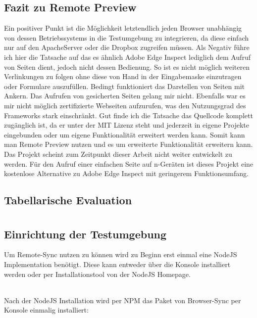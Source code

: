 		\subsection{Fazit zu Remote Preview}
		Ein positiver Punkt ist die Möglichkeit letztendlich jeden Browser unabhängig von dessen Betriebssystems in die 				Testumgebung zu integrieren, da diese einfach nur auf den ApacheServer oder die Dropbox zugreifen müssen. Als Negativ 		führe ich hier die Tatsache auf das es ähnlich Adobe Edge Inspect lediglich dem Aufruf von Seiten dient, jedoch nicht 			dessen Bedienung. So ist es nicht möglich weiteren Verlinkungen zu folgen ohne diese von Hand in der Eingabemaske 			einzutragen oder Formulare auszufüllen. Bedingt funktioniert das Darstellen von Seiten mit Ankern. Das Aufrufen von 			gesicherten Seiten gelang mir nicht. Ebenfalls war es  mir nicht möglich zertifizierte Webseiten aufzurufen, was den 				Nutzungsgrad des Frameworks stark einschränkt. Gut finde ich die Tatsache das Quellcode komplett zugänglich ist, da er 		unter der MIT Lizenz steht und	jederzeit in eigene Projekte eingebunden oder um eigene Funktionalität erweitert werden 			kann. Somit kann man Remote Preview nutzen und es um erweiterte Funktionalität erweitern kann. Das Projekt 				scheint zum Zeitpunkt dieser Arbeit nicht weiter entwickelt zu werden. Für den Aufruf einer einfachen Seite auf n-Geräten 		ist dieses Projekt eine kostenlose Alternative zu Adobe Edge Inspect mit geringerem Funktionsumfang.
		
				
		\subsection{Tabellarische Evaluation}
		
	
\pagebreak
	\section{}	
	\subsection{Einrichtung der Testumgebung}
	Um Remote-Sync nutzen zu können wird zu Beginn erst einmal eine NodeJS Implementation benötigt. Diese kann entweder über die Konsole installiert werden oder per Installationstool von der NodeJS Homepage.
	
	\\Nach der NodeJS Installation wird per NPM das Paket von Browser-Sync per Konsole einmalig installiert:
	

